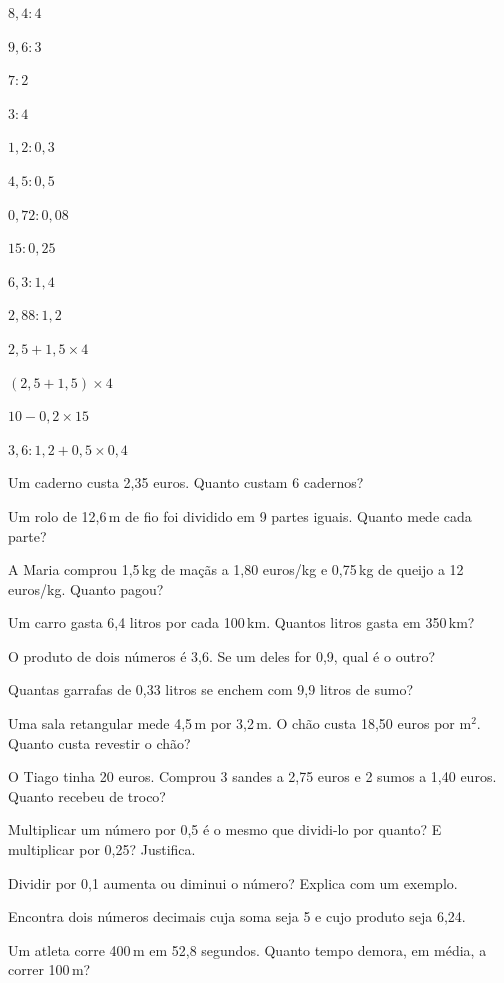 \documentclass[12pt]{article}
\begin{document}
\begin{exercicios}
  \item $8{,}4 : 4$
  \item $9{,}6 : 3$
  \item $7 : 2$
  \item $3 : 4$
  \item $1{,}2 : 0{,}3$
  \item $4{,}5 : 0{,}5$
  \item $0{,}72 : 0{,}08$
  \item $15 : 0{,}25$
  \item $6{,}3 : 1{,}4$
  \item $2{,}88 : 1{,}2$
\end{exercicios}

\begin{exercicios}
  \item $2{,}5 + 1{,}5 \times 4$
  \item $(2{,}5 + 1{,}5) \times 4$
  \item $10 - 0{,}2 \times 15$
  \item $3{,}6 : 1{,}2 + 0{,}5 \times 0{,}4$
  \item Um caderno custa 2,35 euros. Quanto custam 6 cadernos?
  \item Um rolo de 12,6\,m de fio foi dividido em 9 partes iguais. Quanto mede cada parte?
  \item A Maria comprou 1,5\,kg de maçãs a 1,80 euros/kg e 0,75\,kg de queijo a 12 euros/kg. Quanto pagou?
  \item Um carro gasta 6,4 litros por cada 100\,km. Quantos litros gasta em 350\,km?
\end{exercicios}

\begin{exercicios}
  \item O produto de dois números é 3,6. Se um deles for 0,9, qual é o outro?
  \item Quantas garrafas de 0,33 litros se enchem com 9,9 litros de sumo?
  \item Uma sala retangular mede 4,5\,m por 3,2\,m. O chão custa 18,50 euros por m$^2$. Quanto custa revestir o chão?
  \item O Tiago tinha 20 euros. Comprou 3 sandes a 2,75 euros e 2 sumos a 1,40 euros. Quanto recebeu de troco?
  \item Multiplicar um número por 0,5 é o mesmo que dividi-lo por quanto? E multiplicar por 0,25? Justifica.
  \item Dividir por 0,1 aumenta ou diminui o número? Explica com um exemplo.
  \item Encontra dois números decimais cuja soma seja 5 e cujo produto seja 6,24.
  \item Um atleta corre 400\,m em 52,8 segundos. Quanto tempo demora, em média, a correr 100\,m?
\end{exercicios}
\end{document}
